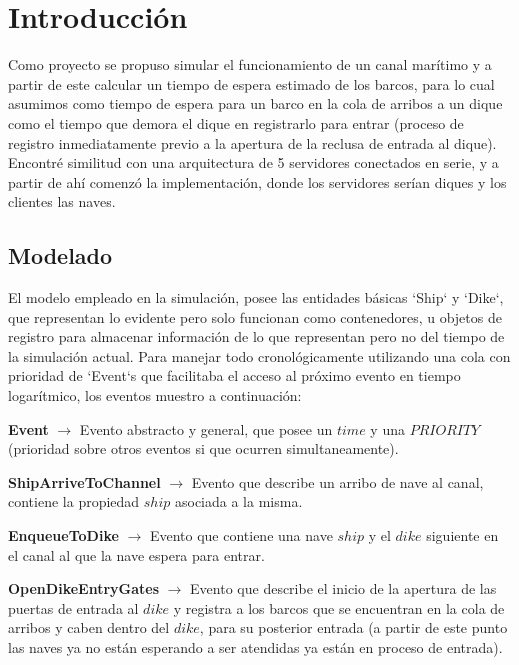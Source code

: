 \documentclass[a4paper,10pt,twocolumn]{article}
\begin{document}
\section{Introducción}
  Como proyecto se propuso simular el funcionamiento de un canal mar\'itimo y a partir de este calcular un tiempo de espera estimado de los barcos, para lo cual asumimos como tiempo de espera para un barco en la cola de arribos a un dique como el tiempo que demora el dique en registrarlo para entrar (proceso de registro inmediatamente previo a la apertura de la reclusa de entrada al dique). Encontr\'e similitud con una arquitectura de 5 servidores conectados en serie, y a partir de ah\'i comenz\'o la implementaci\'on, donde los servidores ser\'ian diques y los clientes las naves.


\subsection{Modelado}

 El modelo empleado en la simulación, posee las entidades b\'asicas `Ship` y `Dike`, que representan lo evidente pero solo funcionan como contenedores, u objetos de registro para almacenar informaci\'on de lo que representan pero no del tiempo de la simulaci\'on actual. Para manejar todo cronol\'ogicamente utilizando una cola con prioridad de `Event`s que facilitaba el acceso al pr\'oximo evento en tiempo logar\'itmico, los eventos muestro a continuaci\'on:
 
 
 
 \textbf{Event} $\rightarrow$ Evento abstracto y general, que posee un $time$ y una $PRIORITY$ (prioridad sobre otros eventos si que ocurren simultaneamente).
 
 \textbf{ShipArriveToChannel} $\rightarrow$ Evento que describe un arribo de nave al canal, contiene la propiedad $ship$ asociada a la misma.
 
 \textbf{EnqueueToDike} $\rightarrow$ Evento que contiene una nave $ship$ y el $dike$ siguiente en el canal al que la nave espera para entrar.
 
 
 \textbf{OpenDikeEntryGates} $\rightarrow$ Evento que describe el inicio de la apertura de las puertas de entrada al $dike$ y registra a los barcos que se encuentran en la cola de arribos y caben dentro del $dike$, para su posterior entrada (a partir de este punto las naves ya no est\'an esperando a ser atendidas ya est\'an en proceso de entrada).
 
\end{document}
